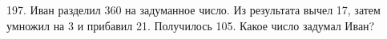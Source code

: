 197. Иван разделил 360 на задуманное число. Из результата вычел 17, затем умножил на 3 и прибавил 21. Получилось 105. Какое число задумал Иван?\\
